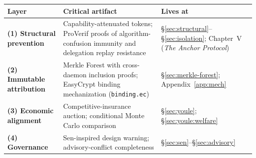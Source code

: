 \documentclass[11pt,a4paper]{article}
\theoremstyle{definition}
\theoremstyle{remark}
\begin{document}
\vspace{0.4cm}
\noindent
\begin{tabularx}{\textwidth}{@{}>{\raggedright\arraybackslash}p{} >{\raggedright\arraybackslash}X >{\raggedright\arraybackslash}p{}@{}}
\toprule
\textbf{Layer} & \textbf{Critical artifact} & \textbf{Lives at} \\
\midrule
\textbf{(1) Structural prevention} & Capability-attenuated tokens; ProVerif proofs of algorithm-confusion immunity and delegation replay resistance & \S\ref{sec:structural}--\S\ref{sec:isolation}; Chapter~V (\emph{The Anchor Protocol}) \\
\textbf{(2) Immutable attribution} & Merkle Forest with cross-daemon inclusion proofs; EasyCrypt binding mechanization (\texttt{binding.ec}) & \S\ref{sec:merkle-forest}; Appendix~\ref{app:mech} \\
\textbf{(3) Economic alignment} & Competitive-insurance auction; conditional Monte Carlo comparison & \S\ref{sec:youle}; \S\ref{sec:youle:welfare} \\
\textbf{(4) Governance} & Sen-inspired design warning; advisory-conflict completeness & \S\ref{sec:sen}--\S\ref{sec:advisory} \\
\bottomrule
\end{tabularx}
\end{document}

